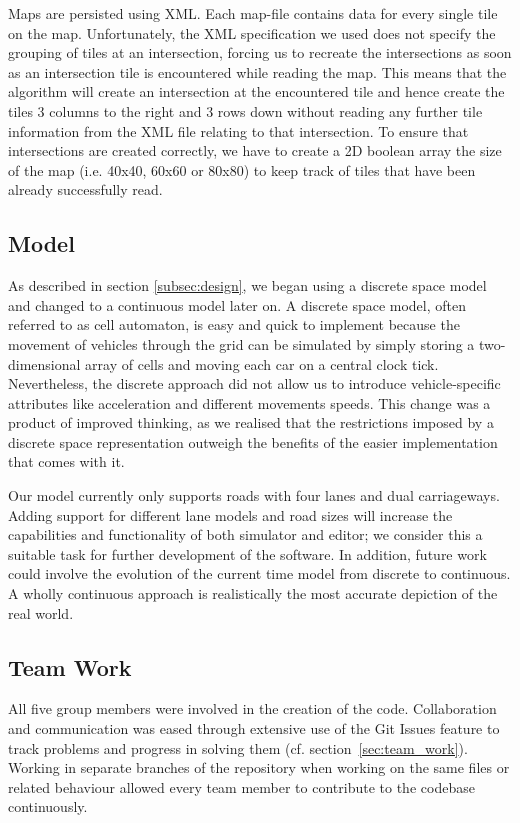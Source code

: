Maps are persisted using XML. Each map-file contains data for every single tile on the map. Unfortunately, the XML specification we used does not specify the grouping of tiles at an intersection, forcing us to recreate the intersections as soon as an intersection tile is encountered while reading the map. This means that the algorithm will create an intersection at the encountered tile and hence create the tiles 3 columns to the right and 3 rows down without reading any further tile information from the XML file relating to that intersection. To ensure that intersections are created correctly, we have to create a 2D boolean array the size of the map (i.e. 40x40, 60x60 or 80x80) to keep track of tiles that have been already successfully read.

\subsection*{Model}
As described in section \ref{subsec:design}, we began using a discrete space model and changed to a continuous model later on. A discrete space model, often referred to as cell automaton, is easy and quick to implement because the movement of vehicles through the grid can be simulated by simply storing a two-dimensional array of cells and moving each car on a central clock tick. Nevertheless, the discrete approach did not allow us to introduce vehicle-specific attributes like acceleration and different movements speeds.
 This change was a product of improved thinking, as we realised that the restrictions imposed by a discrete space representation outweigh the benefits of the easier implementation that comes with it.

Our model currently only supports roads with four lanes and dual carriageways. Adding support for different lane models and road sizes will increase the capabilities and functionality of both simulator and editor; we consider this a suitable task for further development of the software. In addition, future work could involve the evolution of the current time model from discrete to continuous. A wholly continuous approach is realistically the most accurate depiction of the real world. 

\subsection*{Team Work}
All five group members were involved in the creation of the code. Collaboration and communication was eased through extensive use of the Git Issues feature to track problems and progress in solving them (cf. section~\ref{sec:team_work}). Working in separate branches of the repository when working on the same files or related behaviour allowed every team member to contribute to the codebase continuously.  

